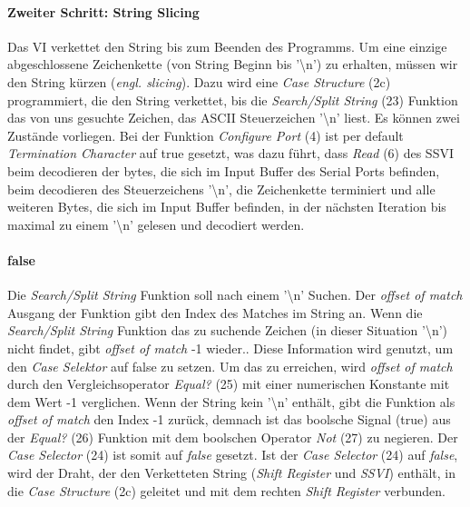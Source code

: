 \documentclass[
fontsize=12pt, 
paper=a4, 
BCOR=10mm, 
twoside=false,
 DIV=10, 
 headsepline, 
 footsepline
 ]{scrartcl}
\begin{document}
\paragraph{Zweiter Schritt: \glqq String Slicing\grqq{}} Das VI verkettet den String bis zum Beenden des Programms. Um eine einzige abgeschlossene Zeichenkette (von String Beginn bis '\textbackslash n') zu erhalten, müssen wir den String kürzen (\textit{engl. slicing}). Dazu wird eine \textit{Case Structure} (2c) programmiert, die den String verkettet, bis die \textit{Search/Split String} (23) Funktion das von uns gesuchte Zeichen, das ASCII Steuerzeichen '\textbackslash n' liest. Es können zwei Zustände vorliegen. Bei der Funktion \textit{Configure Port} (4) ist per default \textit{Termination Character} auf true gesetzt, was dazu führt, dass \textit{Read} (6) des SSVI beim decodieren der bytes, die sich im Input Buffer des Serial Ports befinden, beim decodieren des Steuerzeichens '\textbackslash n', die Zeichenkette terminiert und alle weiteren Bytes, die sich im Input Buffer befinden, in der nächsten Iteration bis maximal zu einem '\textbackslash n' gelesen und decodiert werden.


\paragraph*{false} Die \textit{Search/Split String} Funktion soll nach einem '\textbackslash n' Suchen. Der \textit{offset of match} Ausgang der Funktion gibt den Index des Matches im String an. Wenn die \textit{Search/Split String} Funktion das zu suchende Zeichen (in dieser Situation '\textbackslash n') nicht findet, gibt \textit{offset of match} -1 wieder.. Diese Information wird genutzt, um den \textit{Case Selektor} auf {false} zu setzen. Um das zu erreichen, wird \textit{offset of match} durch den Vergleichsoperator \textit{Equal?} (25) mit einer numerischen Konstante mit dem Wert -1 verglichen. Wenn der String kein '\textbackslash n' enthält, gibt die Funktion als \textit{offset of match} den Index -1 zurück, demnach ist das boolsche Signal (true) aus der \textit{Equal?} (26) Funktion mit dem boolschen Operator \textit{Not} (27) zu negieren. Der \textit{Case Selector} (24) ist somit auf \textit{false} gesetzt.
Ist der \textit{Case Selector} (24) auf \textit{false}, wird der Draht, der den Verketteten String (\textit{Shift Register} und \textit{SSVI}) enthält, in die \textit{Case Structure} (2c) geleitet und mit dem rechten \textit{Shift Register} verbunden.
\end{document}
